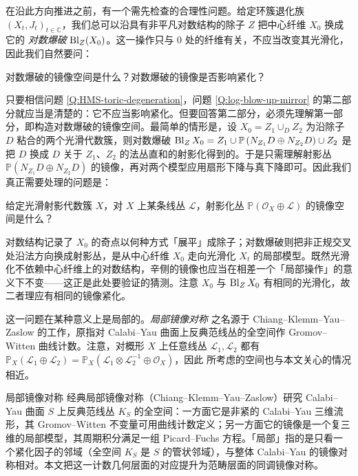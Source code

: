 在沿此方向推进之前，有一个需先检查的合理性问题。给定环簇退化族 $(X_t,J_t)_{t\in\mathbb{C}}$，我们总可以沿具有非平凡对数结构的除子 $Z$ 把中心纤维 $X_0$ 换成它的 \emph{对数爆破} $\operatorname{Bl}_Z (X_0)$。这一操作只与 $0$ 处的纤维有关，不应当改变其光滑化，因此我们自然要问：

\begin{ques}\label{Q:log-blow-up-mirror}
    对数爆破的镜像空间是什么？对数爆破的镜像是否影响紧化？
\end{ques}

只要相信问题 \ref{Q:HMS-toric-degeneration}，问题 \ref{Q:log-blow-up-mirror} 的第二部分就应当是清楚的：它不应当影响紧化。但要回答第二部分，必须先理解第一部分，即构造对数爆破的镜像空间。最简单的情形是，设 $X_0=Z_1\cup_D Z_2$ 为沿除子 $D$ 粘合的两个光滑代数簇，则对数爆破 $\operatorname{Bl}_Z X_0=Z_1\cup\mathbb{P}\left(N_{Z_1} D\oplus N_{Z_2} D\right)\cup Z_2$ 是把 $D$ 换成 $D$ 关于 $Z_1$、$Z_2$ 的法丛直和的射影化得到的。于是只需理解射影丛 $\mathbb{P}\left(N_{Z_1} D\oplus N_{Z_2} D\right)$ 的镜像，再对两个模型应用扇形下降与真下降即可。因此我们真正需要处理的问题是：

\begin{ques}\label{Q:mirror-projective-bundle}
    给定光滑射影代数簇 $X$，对 $X$ 上某条线丛 $\mathcal{L}$，射影化丛 $\mathbb{P} (\mathcal{O}_X\oplus\mathcal{L})$ 的镜像空间是什么？
\end{ques}

\begin{yizhu}[对数爆破为什么会出现在这里]
对数结构记录了 $X_0$ 的奇点以何种方式「展平」成除子；对数爆破则把非正规交叉处沿法方向换成射影丛，是从中心纤维 $X_0$ 走向光滑化 $X_t$ 的局部模型。既然光滑化不依赖中心纤维上的对数结构，辛侧的镜像也应当在相差一个「局部操作」的意义下不变——这正是此处要验证的猜测。注意 $X_0$ 与 $\operatorname{Bl}_Z X_0$ 有相同的光滑化，故二者理应有相同的镜像紧化。
\end{yizhu}

这一问题在某种意义上是局部的。\emph{局部镜像对称} 之名源于 Chiang--Klemm--Yau--Zaslow \cite{CKYZ99} 的工作，原指对 Calabi--Yau 曲面上反典范线丛的全空间作 Gromov--Witten 曲线计数。注意，对概形 $X$ 上任意线丛 $\mathcal{L}_1,\mathcal{L}_2$ 都有 $\mathbb{P}_X (\mathcal{L}_1\oplus\mathcal{L}_2)=\mathbb{P}_X (\mathcal{L}_1\otimes\mathcal{L}_2^{-1}\oplus\mathcal{O}_X)$，因此 \cite{CKYZ99} 所考虑的空间也与本文关心的情况相近。

\begin{conceptbox}{局部镜像对称}
经典局部镜像对称（Chiang--Klemm--Yau--Zaslow）研究 Calabi--Yau 曲面 $S$ 上反典范线丛 $K_S$ 的全空间：一方面它是非紧的 Calabi--Yau 三维流形，其 Gromov--Witten 不变量可用曲线计数定义；另一方面它的镜像是一个复三维的局部模型，其周期积分满足一组 Picard--Fuchs 方程。「局部」指的是只看一个紧化因子的邻域（全空间 $K_S$ 是 $S$ 的管状邻域），与整体 Calabi--Yau 的镜像对称相对。本文把这一计数几何层面的对应提升为范畴层面的同调镜像对称。
\par\smallskip{}
\end{conceptbox}

